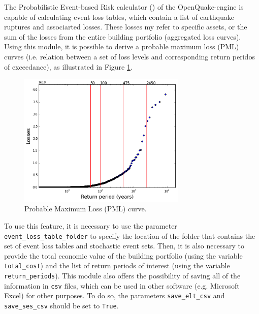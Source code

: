 The Probabilistic Event-based Risk calculator (\citep{SilvaEtAl2014a}) of the OpenQuake-engine is capable of calculating event loss tables, which contain a list of earthquake ruptures and associarted losses. These losses my refer to specific assets, or the sum of the losses from the entire building portfolio (aggregated loss curves). 
Using this module, it is possible to derive a probable maximum loss (PML) curves (i.e. relation between a set of loss levels and corresponding return peridos of exceedance), as illustrated in Figure \ref{fig:pml}.

\begin{figure}[htb]
  \centering
      \includegraphics[width=8cm]{Figures/pml_example.png}
  \caption{Probable Maximum Loss (PML) curve.}
  \label{fig:pml}
\end{figure}

To use this feature, it is necessary to use the parameter \verb=event_loss_table_folder= to specify the location of the folder that contains the set of event loss tables and stochastic event sets. Then, it is also necessary to provide the total economic value of the building portfolio (using the variable \verb=total_cost=) and the list of return periods of interest (using the variable \verb=return_periods=). This module also offers the possibility of saving all of the information in \verb=csv= files, which can be used in other software (e.g. Microsoft Excel) for other purposes. To do so, the parameters \verb=save_elt_csv= and \verb=save_ses_csv= should be set to \verb=True=.
